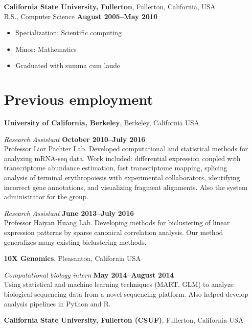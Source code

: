 \documentclass[11pt,notitlepage]{article} %
\begin{document}
\bigskip

{\bf California State University, Fullerton}, Fullerton, California, USA\\
B.S., Computer Science \hfill {\bf August 2005--May 2010}
\begin{itemize}[noitemsep,topsep=0pt]
\item Specialization: Scientific computing
\item Minor: Mathematics
\item Graduated with summa cum laude
\end{itemize}

\bigskip
\section*{Previous employment}

{\bf University of California, Berkeley}, Berkeley, California USA

{\em Research Assistant} \hfill {\bf October 2010--July 2016}\\
Professor Lior Pachter Lab.
Developed computational and statistical methods for analyzing mRNA-seq data.
Work included: differential expression coupled with transcriptome abundance estimation, fast transcriptome mapping, splicing analysis of terminal erythropoiesis with experimental collaborators, identifying incorrect gene annotations, and visualizing fragment alignments.
Also the system administrator for the group.

\medskip

{\em Research Assistant} \hfill {\bf June 2013--July 2016}\\
Professor Haiyan Huang Lab. Developing methods for biclustering of linear
expression patterns by sparse canonical correlation analysis. Our method
generalizes many existing biclustering methods.


\bigskip

{\bf 10X Genomics}, Pleasanton, California USA

{\em Computational biology intern} \hfill {\bf May 2014--August 2014}\\
Using statistical and machine learning techniques (MART, GLM) to analyze
biological sequencing data from a novel sequencing platform. Also helped
develop analysis pipelines in Python and R.

\bigskip

{\bf California State University, Fullerton (CSUF)}, Fullerton, California USA
\end{document}
